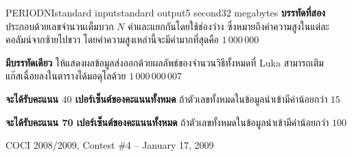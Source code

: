 \documentclass[11pt,a4paper]{article}
\begin{document}
\begin{problem}{PERIODNI}{standard input}{standard output}{5 second}{32 megabytes}
\textbf{บรรทัดที่สอง}   ประกอบด้วยเลขจำนวนเต็มบวก $N$ ค่าและแยกกันโดยใช้ช่องว่าง   ซึ่งหมายถึงค่าความสูงในแต่ละคอลัมน์จากซ้ายไปขวา   โดยค่าความสูงเหล่านี้จะมีค่ามากที่สุดคือ $1\,000\,000$



\OutputFile

\textbf{มีบรรทัดเดียว} ให้แสดงผลข้อมูลส่งออกด้วยผลลัพธ์ของจำนวนวิธีทั้งหมดที่ Luka สามารถเติมแก๊สเฉื่อยลงในตารางได้มอดุโลด้วย $1\,000\,000\,007$

\Examples

\begin{example}
%
%
%
\end{example}

\Scoring

\textbf{จะได้รับคะแนน $40$ เปอร์เซ็นต์ของคะแนนทั้งหมด}   ถ้าตัวเลขทั้งหมดในข้อมูลนำเข้ามีค่าน้อยกว่า $15$

\textbf{จะได้รับคะแนน 70 เปอร์เซ็นต์ของคะแนนทั้งหมด}   ถ้าตัวเลขทั้งหมดในข้อมูลนำเข้ามีค่าน้อยกว่า $100$
  
\Source

COCI 2008/2009, Contest \#4 – January 17, 2009

\end{problem}
\end{document}
